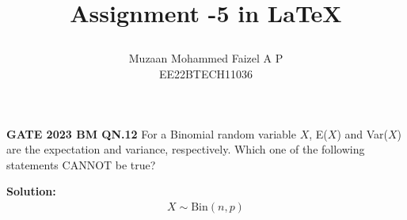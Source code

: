 \documentclass[journal,12pt,twocolumn]{IEEEtran}
\providecommand{\pr}[1]{\ensuremath{\Pr\left(#1\right)}}
\providecommand{\cbrak}[1]{\ensuremath{\left\{#1\right\}}}
\begin{document}
\newtheorem{theorem}{Theorem}[section]
\newtheorem{problem}{Problem}
\newtheorem{proposition}{Proposition}[section]
\newtheorem{lemma}{Lemma}[section]
\newtheorem{corollary}[theorem]{Corollary}
\newtheorem{example}{Example}[section]
\newtheorem{definition}[problem]{Definition}
\newcommand{\BEQA}{\begin{eqnarray}}
\newcommand{\EEQA}{\end{eqnarray}}
\newcommand{\define}{\stackrel{\triangle}{=}}
\newcommand{\xor}{\oplus}


\providecommand{\mbf}{\mathbf}
\providecommand{\pr}[1]{\ensuremath{\Pr\left(#1\right)}}
\providecommand{\qfunc}[1]{\ensuremath{Q\left(#1\right)}}
\providecommand{\sbrak}[1]{\ensuremath{{}\left[#1\right]}}
\providecommand{\lsbrak}[1]{\ensuremath{{}\left[#1\right.}}
\providecommand{\rsbrak}[1]{\ensuremath{{}\left.#1\right]}}
\providecommand{\brak}[1]{\ensuremath{\left(#1\right)}}
\providecommand{\lbrak}[1]{\ensuremath{\left(#1\right.}}
\providecommand{\rbrak}[1]{\ensuremath{\left.#1\right)}}
\providecommand{\cbrak}[1]{\ensuremath{\left\{#1\right\}}}
\providecommand{\lcbrak}[1]{\ensuremath{\left\{#1\right.}}
\providecommand{\rcbrak}[1]{\ensuremath{\left.#1\right\}}}
\theoremstyle{remark}
\newtheorem{rem}{Remark}
\newcommand{\sgn}{\mathop{\mathrm{sgn}}}

\newcommand{\solution}{\noindent \textbf{Solution: }}
\newcommand{\cosec}{\,\text{cosec}\,}
\providecommand{\dec}[2]{\ensuremath{\overset{#1}{\underset{#2}{\gtrless}}}}
\newcommand{\myvec}[1]{\ensuremath{\begin{pmatrix}#1\end{pmatrix}}}
\newcommand{\mydet}[1]{\ensuremath{\begin{vmatrix}#1\end{vmatrix}}}

\let\vec\mathbf


\vspace{3cm}

\title{
  

  Assignment -5 in \LaTeX
    
  }
  \author{ Muzaan Mohammed Faizel A P\\
  EE22BTECH11036
  }	
\maketitle
\newpage
\bigskip
\renewcommand{\thefigure}{\theenumi}
\renewcommand{\thetable}{\theenumi}
\renewcommand{\thetable}{\arabic{table}} 
\textbf{GATE 2023 BM QN.12}
For a Binomial random variable $X$, E($X$) and Var($X$) are the expectation and
variance, respectively. Which one of the following statements CANNOT be true?
\begin{table}[ht!]
		\centering
		
		\caption{}
		\label{table:table1}	
\end{table}
\fi
\solution
\begin{align}
X \sim \text{Bin}\brak{n,p} \nonumber
\end{align}
\end{document}
